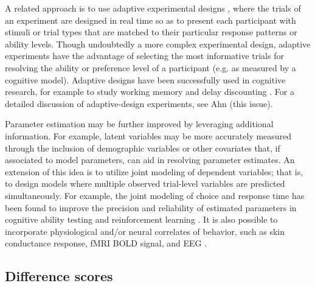 \documentclass[a4paper,12pt]{article}
\begin{document}
A related approach is to use adaptive experimental designs \cite{myung2013tutorial}, where the trials of an experiment are designed in real time so as to present each participant with stimuli or trial types that are matched to their particular response patterns or ability levels. Though undoubtedly a more complex experimental design, adaptive experiments have the advantage of selecting the most informative trials for resolving the ability or preference level of a participant (e.g. as measured by a cognitive model). Adaptive designs have been successfully used in cognitive research, for example to study working memory \cite{gonthier2018measuring} and delay discounting \cite{ahn2020rapid}. For a detailed discussion of adaptive-design experiments, see Ahn (this issue). 

Parameter estimation may be further improved by leveraging additional information. For example, latent variables may be more accurately measured through the inclusion of demographic variables or other covariates \cite{Curran2016-bt} that, if associated to model parameters, can aid in resolving parameter estimates. An extension of this idea is to utilize joint modeling of dependent variables; that is, to design models where multiple observed trial-level variables are predicted simultaneously. For example, the joint modeling of choice and response time has been found to improve the precision and reliability of estimated parameters in cognitive ability testing \cite{bertling2018using} and reinforcement learning \cite{ballard2019joint, shahar2019improving}. It is also possible to incorporate physiological and/or neural correlates of behavior, such as skin conductance response, fMRI BOLD signal, and EEG \cite{palestro2018tutorial}. 

\subsection{Difference scores}
\end{document}
